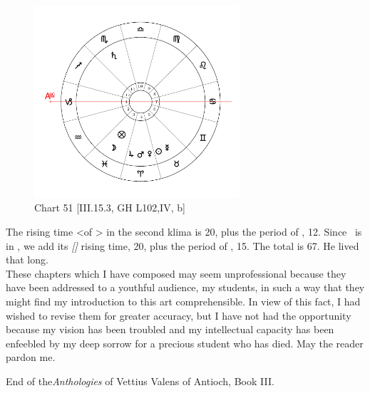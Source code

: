 \clearpage
\begin{figure}
\centering
\vspace{-28pt}
\includegraphics[width=0.68\textwidth]{charts/3_15_3}
\caption{Chart 51 [III.15.3, GH L102,IV, b]}
\label{fig:chart51}
\end{figure} 

The rising time <of \Pisces> in the second klima is 20, plus the period of \Jupiter, 12. Since \Jupiter\, is in \Aries, we add its \textsl{[\Aries]} rising time, 20, plus the period of \Mars, 15. The total is 67. He lived that long. \\
\newline
\newline
These chapters which I have composed may seem unprofessional because they have been addressed to a youthful audience, my students, in such a way that they might find my introduction to this art comprehensible. In view of this fact, I had wished to revise them for greater accuracy, but I have not had the opportunity because my vision has been troubled and my intellectual capacity has been enfeebled by my deep sorrow for a precious student who has died. May the reader pardon me.

End of the\textit{Anthologies} of Vettius Valens of Antioch, Book III.

\newpage